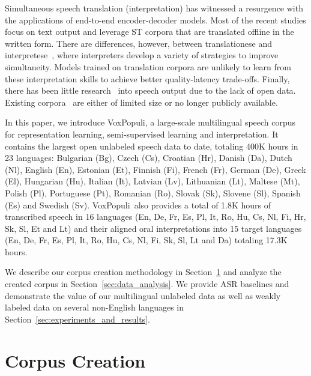 \documentclass[11pt,a4paper]{article}
\newcommand{\vp}{VoxPopuli}
\begin{document}
Simultaneous speech translation (interpretation) has witnessed a resurgence with the applications of end-to-end encoder-decoder models. Most of the recent studies focus on text output and leverage ST corpora that are translated offline in the written form. There are differences, however, between translationese and interpretese~\citep{sridhar2013corpus,he2016interpretese}, where interpreters develop a variety of strategies to improve simultaneity. Models trained on translation corpora are unlikely to learn from these interpretation skills to achieve better quality-latency trade-offs. Finally, there has been little research~\citep{translatotron,tjandra2019speech,zhang2020uwspeech} into speech output due to the lack of open data. Existing corpora~\citep{tohyama2004ciair,bendazzoli2005approach} are either of limited size or no longer publicly available.

In this paper, we introduce \vp, a large-scale multilingual speech corpus for representation learning, semi-supervised learning and interpretation. It contains the largest open unlabeled speech data to date, totaling 400K hours in 23 languages: Bulgarian (Bg), Czech (Cs), Croatian (Hr), Danish (Da), Dutch (Nl), English (En), Estonian (Et), Finnish (Fi), French (Fr), German (De), Greek (El), Hungarian (Hu), Italian (It), Latvian (Lv), Lithuanian (Lt), Maltese (Mt), Polish (Pl), Portuguese (Pt), Romanian (Ro), Slovak (Sk), Slovene (Sl), Spanish (Es) and Swedish (Sv). \vp~also provides a total of 1.8K hours of transcribed speech in 16 languages (En, De, Fr, Es, Pl, It, Ro, Hu, Cs, Nl, Fi, Hr, Sk, Sl, Et and Lt) and their aligned oral interpretations into 15 target languages (En, De, Fr, Es, Pl, It, Ro, Hu, Cs, Nl, Fi, Sk, Sl, Lt and Da) totaling 17.3K hours.

We describe our corpus creation methodology in Section~\ref{sec:corpus_creation} and analyze the created corpus in Section~\ref{sec:data_analysis}. We provide ASR baselines and demonstrate the value of our multilingual unlabeled data as well as weakly labeled data on several non-English languages in Section~\ref{sec:experiments_and_results}.

\section{Corpus Creation}
\label{sec:corpus_creation}
\end{document}
